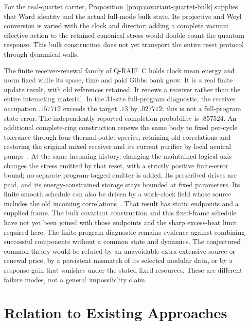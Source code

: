 \documentclass[12pt,a4paper]{article}
\begin{document}
For the real-quartet carrier, Proposition~\ref{prop:covariant-quartet-bulk}
supplies that Ward identity and the actual full-mode bulk state. Its
projective and Weyl conversion is varied with the clock and director;
adding a complete vacuum effective action to the retained canonical
stress would double count the quantum response. This bulk construction
does not yet transport the entire reset protocol through dynamical walls.

The finite receiver-renewal family of Q-RAIF~C holds clock mean energy
and norm fixed while its space, time and paid Gibbs bank grow. It is a
real finite update result, with old references retained. It renews a
receiver rather than the entire interacting material. In the 31-site
full-program diagnostic, the receiver occupation $.157712$ exceeds
the target $.13$ by $.027712$; this is not a full-program state error.
The independently reported completion probability is $.857524$.
An additional complete-ring construction renews the same body to fixed
per-cycle tolerance through four thermal outlet species, retaining old
correlations and restoring the original mixed receiver and its current
purifier by local neutral pumps~\cite{QRC}. At the same incoming
history, changing the maintained logical axis changes the stress
emitted by that reset, with a strictly positive finite-error bound;
no separate program-tagged emitter is added. Its prescribed drives are
paid, and its energy-constrained storage stays bounded at fixed
parameters. Its finite smooth schedule can also be driven by a work-clock
field whose source includes the old incoming correlations~\cite[Section
on a spatial work clock]{QRC}. That result has static endpoints and a
supplied frame. The bulk covariant construction and this fixed-frame
schedule have not yet been joined with those endpoints and the sharp
excess-heat limit required here.
The finite-program diagnostic remains evidence against combining successful
components without a common state and dynamics. The conjectured common theory
would be refuted by an unavoidable extra extensive source or renewal
price, by a persistent mismatch of its selected modular data, or by a
response gain that vanishes under the stated fixed resources. These
are different failure modes, not a general impossibility claim.

\section{Relation to Existing Approaches}
\label{sec:relation}
\end{document}
